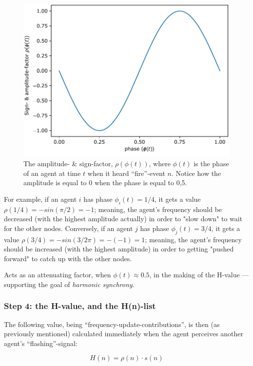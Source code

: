 	\begin{figure}[ht!]
		\centering
		\includegraphics[width=0.9\linewidth]{Assets/Figures/rho_n.pdf}
		\caption{The amplitude- \& sign-factor, $\rho(\phi(t))$, where $\phi(t)$ is the phase of an agent at time $t$ when it heard ``fire''-event $n$. Notice how the amplitude is equal to 0 when the phase is equal to 0,5.}
		\label{fig:rho_n}
	\end{figure}
	
	For example, if an agent $i$ has phase $\phi_i(t)=1/4$, it gets a value $\rho(1/4) = - sin(\pi/2) = -1$; meaning, the agent's frequency should be decreased (with the highest amplitude actually) in order to "slow down" to wait for the other nodes. Conversely, if an agent $j$ has phase $\phi_j(t)=3/4$, it gets a value $\rho(3/4) = - sin(3/2 \pi) = -(-1) = 1$; meaning, the agent's frequency should be increased (with the highest amplitude) in order to getting "pushed forward" to catch up with the other nodes.
	
	Acts as an attenuating factor, when $\phi(t)\approx0.5$, in the making of the H-value — supporting the goal of \textit{harmonic synchrony}.

	\subsubsection{Step 4: the H-value, and the H(n)-list}
	
	The following value, being ``frequency-update-contributions'', is then (as previously mentioned) calculated immediately when the agent perceives another agent's ``flashing''-signal:
	
	\begin{equation}
	\label{h_value}
		H(n) = \rho(n) \cdot s(n)
	\end{equation}
	
